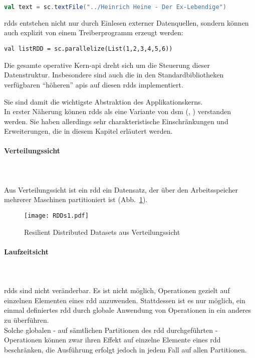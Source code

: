 \begin{lstlisting}[language=Scala]
val text = sc.textFile("../Heinrich Heine - Der Ex-Lebendige")
\end{lstlisting}

\Glspl{rdd} entstehen nicht nur durch Einlesen externer Datenquellen, sondern können auch explizit von einem Treiberprogramm erzeugt werden:\\

\begin{lstlisting}
val listRDD = sc.parallelize(List(1,2,3,4,5,6))
\end{lstlisting}

Die gesamte operative Kern-\gls{api} dreht sich um die Steuerung dieser Datenstruktur. Insbesondere sind auch die in den Standardbibliotheken verfügbaren "`höheren"' \glspl{api} auf diesen \glspl{rdd} implementiert.

Sie sind damit die wichtigste Abstraktion des Applikationskerns.\\

In erster Näherung können \glspl{rdd} als eine Variante von \gls{dsm} (\cite{Nitzberg:1991:DSM:112827.112855}, \cite{Mat12}) verstanden werden. Sie haben allerdings sehr charakteristische Einschränkungen und Erweiterungen, die in diesem Kapitel erläutert werden.\\

\paragraph{Verteilungssicht}\\

\\
Aus Verteilungssicht ist ein \gls{rdd} ein Datensatz, der über den Arbeitsspeicher mehrerer Maschinen partitioniert ist (Abb.~\ref{fig:rdds1}).

\begin{figure}[ht!]
	\centering
  \texttt{[image: RDDs1.pdf]}
	\caption{Resilient Distributed Datasets aus Verteilungssicht}
	\label{fig:rdds1}
\end{figure}

\paragraph{Laufzeitsicht}\\

\\
\Glspl{rdd} sind nicht veränderbar. Es ist nicht möglich, Operationen gezielt auf einzelnen Elementen eines \gls{rdd} anzuwenden. Stattdessen ist es nur möglich, ein einmal definiertes \gls{rdd} durch globale Anwendung von Operationen in ein anderes zu überführen.\\
Solche globalen - auf sämtlichen Partitionen des \gls{rdd} durchgeführten - Operationen können zwar ihren Effekt auf einzelne Elemente eines \gls{rdd} beschränken, die Ausführung erfolgt jedoch in jedem Fall auf allen Partitionen.\\

